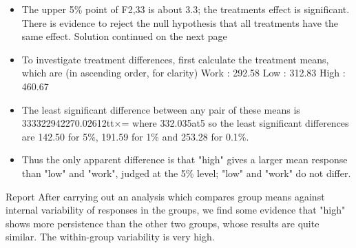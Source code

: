 \documentclass[a4paper,12pt]{article}
\begin{document}
\begin{enumerate}
\begin{itemize}
\item The upper 5\% point of F2,33 is about 3.3; the treatments effect is significant. There is evidence to reject the null hypothesis that all treatments have the same effect.
Solution continued on the next page
\item To investigate treatment differences, first calculate the treatment means, which are (in ascending order, for clarity)
Work : 292.58 Low : 312.83 High : 460.67
\item The least significant difference between any pair of these means is
333322942270.02612tt×= where 332.035at5%
so the least significant differences are 142.50 for 5\%, 191.59 for 1\% and 253.28 for 0.1\%. 
\item Thus the only apparent difference is that "high" gives a larger mean response than "low" and "work", judged at the 5\% level; "low" and "work" do not differ.
\end{itemize}

\begin{framed}
Report
After carrying out an analysis which compares group means against internal variability of responses in the groups, we find some evidence that "high" shows more persistence than the other two groups, whose results are quite similar. The within-group variability is very high.
\end{framed}
\end{enumerate}
\end{document}
